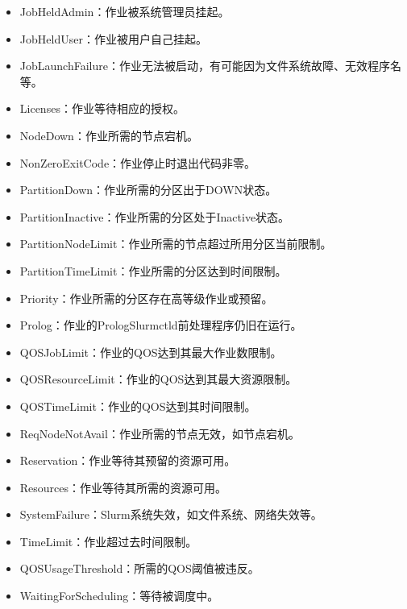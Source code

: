 \begin{itemize}
\begin{itemize}
    \item JobHeldAdmin：作业被系统管理员挂起。
    \item JobHeldUser：作业被用户自己挂起。
    \item JobLaunchFailure：作业无法被启动，有可能因为文件系统故障、无效程序名等。
    \item Licenses：作业等待相应的授权。
    \item NodeDown：作业所需的节点宕机。
    \item NonZeroExitCode：作业停止时退出代码非零。
    \item PartitionDown：作业所需的分区出于DOWN状态。
    \item PartitionInactive：作业所需的分区处于Inactive状态。
    \item PartitionNodeLimit：作业所需的节点超过所用分区当前限制。
    \item PartitionTimeLimit：作业所需的分区达到时间限制。
    \item Priority：作业所需的分区存在高等级作业或预留。
    \item Prolog：作业的PrologSlurmctld前处理程序仍旧在运行。
    \item QOSJobLimit：作业的QOS达到其最大作业数限制。
    \item QOSResourceLimit：作业的QOS达到其最大资源限制。
    \item QOSTimeLimit：作业的QOS达到其时间限制。
    \item ReqNodeNotAvail：作业所需的节点无效，如节点宕机。
    \item Reservation：作业等待其预留的资源可用。
    \item Resources：作业等待其所需的资源可用。
    \item SystemFailure：Slurm系统失效，如文件系统、网络失效等。
    \item TimeLimit：作业超过去时间限制。
    \item QOSUsageThreshold：所需的QOS阈值被违反。
    \item WaitingForScheduling：等待被调度中。
\end{itemize}
\end{itemize}

